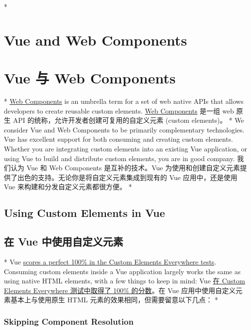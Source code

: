 
\begin{paracol}{2} 
\switchcolumn[0]*%
\section{Vue and Web Components}
\switchcolumn
\section{Vue 与 Web Components}
\switchcolumn[0]*%
\href{https://developer.mozilla.org/en-US/docs/Web/Web_Components}{Web
Components} is an umbrella term for a set of web native APIs that allows
developers to create reusable custom elements.
\switchcolumn
\href{https://developer.mozilla.org/en-US/docs/Web/Web_Components}{Web
Components} 是一组 web 原生 API 的统称，允许开发者创建可复用的自定义元素
(custom elements)。
\switchcolumn[0]*%
We consider Vue and Web Components to be primarily complementary
technologies. Vue has excellent support for both consuming and creating
custom elements. Whether you are integrating custom elements into an
existing Vue application, or using Vue to build and distribute custom
elements, you are in good company.
\switchcolumn
我们认为 Vue 和 Web Components 是互补的技术。Vue
为使用和创建自定义元素提供了出色的支持。无论你是将自定义元素集成到现有的
Vue 应用中，还是使用 Vue 来构建和分发自定义元素都很方便。
\switchcolumn[0]*%
\subsection{Using Custom Elements in Vue}
\switchcolumn
\subsection{在 Vue 中使用自定义元素}
\switchcolumn[0]*%
Vue
\href{https://custom-elements-everywhere.com/libraries/vue/results/results.html}{scores
a perfect 100\% in the Custom Elements Everywhere tests}. Consuming
custom elements inside a Vue application largely works the same as using
native HTML elements, with a few things to keep in mind:
\switchcolumn
Vue
\href{https://custom-elements-everywhere.com/libraries/vue/results/results.html}{在
Custom Elements Everywhere 测试中取得了 100\% 的分数}。在 Vue
应用中使用自定义元素基本上与使用原生 HTML
元素的效果相同，但需要留意以下几点：
\switchcolumn[0]*%
\subsubsection{Skipping Component Resolution}
\switchcolumn

\end{paracol}
